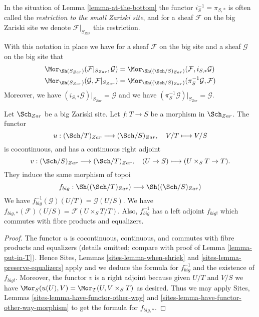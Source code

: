 \begin{definition}
\label{definition-restriction-small-zariski}
In the situation of
Lemma \ref{lemma-at-the-bottom}
the functor $i_S^{-1} = \pi_{S, *}$ is often
called the {\it restriction to the small Zariski site}, and for a sheaf
$\mathcal{F}$ on the big Zariski site we denote $\mathcal{F}|_{S_{Zar}}$
this restriction.
\end{definition}

\noindent
With this notation in place we have for a sheaf $\mathcal{F}$ on the
big site and a sheaf $\mathcal{G}$ on the big site that
\begin{align*}
\Mor_{\Sh(S_{Zar})}(\mathcal{F}|_{S_{Zar}}, \mathcal{G})
& =
\Mor_{\Sh((\Sch/S)_{Zar})}(\mathcal{F},
i_{S, *}\mathcal{G}) \\
\Mor_{\Sh(S_{Zar})}(\mathcal{G}, \mathcal{F}|_{S_{Zar}})
& =
\Mor_{\Sh((\Sch/S)_{Zar})}(\pi_S^{-1}\mathcal{G},
\mathcal{F})
\end{align*}
Moreover, we have $(i_{S, *}\mathcal{G})|_{S_{Zar}} = \mathcal{G}$
and we have $(\pi_S^{-1}\mathcal{G})|_{S_{Zar}} = \mathcal{G}$.

\begin{lemma}
\label{lemma-morphism-big}
Let $\Sch_{Zar}$ be a big Zariski site.
Let $f : T \to S$ be a morphism in $\Sch_{Zar}$.
The functor
$$
u : (\Sch/T)_{Zar} \longrightarrow (\Sch/S)_{Zar},
\quad
V/T \longmapsto V/S
$$
is cocontinuous, and has a continuous right adjoint
$$
v : (\Sch/S)_{Zar} \longrightarrow (\Sch/T)_{Zar},
\quad
(U \to S) \longmapsto (U \times_S T \to T).
$$
They induce the same morphism of topoi
$$
f_{big} :
\Sh((\Sch/T)_{Zar})
\longrightarrow
\Sh((\Sch/S)_{Zar})
$$
We have $f_{big}^{-1}(\mathcal{G})(U/T) = \mathcal{G}(U/S)$.
We have $f_{big, *}(\mathcal{F})(U/S) = \mathcal{F}(U \times_S T/T)$.
Also, $f_{big}^{-1}$ has a left adjoint $f_{big!}$ which commutes with
fibre products and equalizers.
\end{lemma}

\begin{proof}
The functor $u$ is cocontinuous, continuous, and commutes with fibre products
and equalizers (details omitted; compare with proof of
Lemma \ref{lemma-put-in-T}).
Hence
Sites, Lemmas \ref{sites-lemma-when-shriek} and
\ref{sites-lemma-preserve-equalizers}
apply and we deduce the formula
for $f_{big}^{-1}$ and the existence of $f_{big!}$. Moreover,
the functor $v$ is a right adjoint because given $U/T$ and $V/S$
we have $\Mor_S(u(U), V) = \Mor_T(U, V \times_S T)$
as desired. Thus we may apply
Sites, Lemmas \ref{sites-lemma-have-functor-other-way} and
\ref{sites-lemma-have-functor-other-way-morphism}
to get the formula for $f_{big, *}$.
\end{proof}

